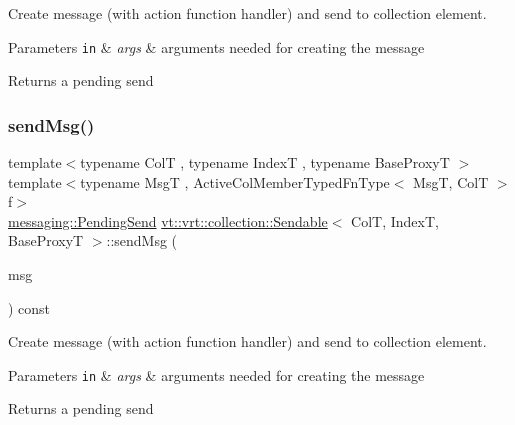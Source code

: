 Create message (with action function handler) and send to collection element. 


\begin{DoxyParams}[1]{Parameters}
\mbox{\tt in}  & {\em args} & arguments needed for creating the message\\
\hline
\end{DoxyParams}
\begin{DoxyReturn}{Returns}
a pending send 
\end{DoxyReturn}
\mbox{\label{structvt_1_1vrt_1_1collection_1_1_sendable_a1bae1b58a1ce80fd76ee43ff4d33905a}} 
\subsubsection{\texorpdfstring{send\+Msg()}{sendMsg()}\hspace{0.1cm}{\footnotesize\ttfamily [1/3]}}
{\footnotesize\ttfamily template$<$typename ColT , typename IndexT , typename Base\+ProxyT $>$ \\
template$<$typename MsgT , Active\+Col\+Member\+Typed\+Fn\+Type$<$ Msg\+T, Col\+T $>$ f$>$ \\
\hyperlink{structvt_1_1messaging_1_1_pending_send}{messaging\+::\+Pending\+Send} \hyperlink{structvt_1_1vrt_1_1collection_1_1_sendable}{vt\+::vrt\+::collection\+::\+Sendable}$<$ ColT, IndexT, Base\+ProxyT $>$\+::send\+Msg (\begin{DoxyParamCaption}\item[{\hyperlink{structvt_1_1messaging_1_1_msg_ptr_thief}{messaging\+::\+Msg\+Ptr\+Thief}$<$ MsgT $>$}]{msg }\end{DoxyParamCaption}) const}



Create message (with action function handler) and send to collection element. 


\begin{DoxyParams}[1]{Parameters}
\mbox{\tt in}  & {\em args} & arguments needed for creating the message\\
\hline
\end{DoxyParams}
\begin{DoxyReturn}{Returns}
a pending send 
\end{DoxyReturn}
\mbox{\label{structvt_1_1vrt_1_1collection_1_1_sendable_a1bae1b58a1ce80fd76ee43ff4d33905a}} 
